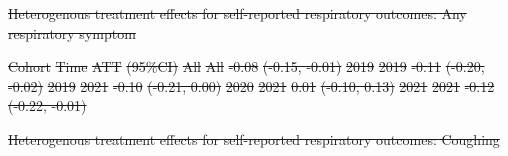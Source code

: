 \documentclass[
  letterpaper,
  DIV=11,
  numbers=noendperiod]{scrartcl}
\makeatletter
\renewenvironment{table}%
   {\renewcommand\familydefault\sfdefault
    \@float{table}}
   {\end@float}
\providecommand{\DIFdeltex}[1]{{\protect\color{red}\sout{#1}}}                      %
\providecommand{\DIFdelFL}[1]{\DIFdel{#1}} %
\providecommand{\DIFdel}[1]{\texorpdfstring{\DIFdeltex{#1}}{}} %
\makeatother
\begin{document}
{%
\DIFdelFL{Heterogenous treatment effects for self-reported respiratory outcomes:
Any respiratory symptom }}%

\DIFdelFL{Cohort }%
\DIFdelFL{Time }%
\DIFdelFL{ATT }%
\DIFdelFL{(95\%CI)}%
\DIFdelFL{All }%
\DIFdelFL{All }%
\DIFdelFL{-0.08 }%
\DIFdelFL{(-0.15, -0.01)}%
\DIFdelFL{2019 }%
\DIFdelFL{2019 }%
\DIFdelFL{-0.11 }%
\DIFdelFL{(-0.20, -0.02)}%
\DIFdelFL{2019 }%
\DIFdelFL{2021 }%
\DIFdelFL{-0.10 }%
\DIFdelFL{(-0.21, 0.00)}%
\DIFdelFL{2020 }%
\DIFdelFL{2021 }%
\DIFdelFL{0.01 }%
\DIFdelFL{(-0.10, 0.13)}%
\DIFdelFL{2021 }%
\DIFdelFL{2021 }%
\DIFdelFL{-0.12 }%
\DIFdelFL{(-0.22, -0.01)}%

{%
\DIFdelFL{Heterogenous treatment effects for self-reported respiratory outcomes:
Coughing }}%
\end{document}
